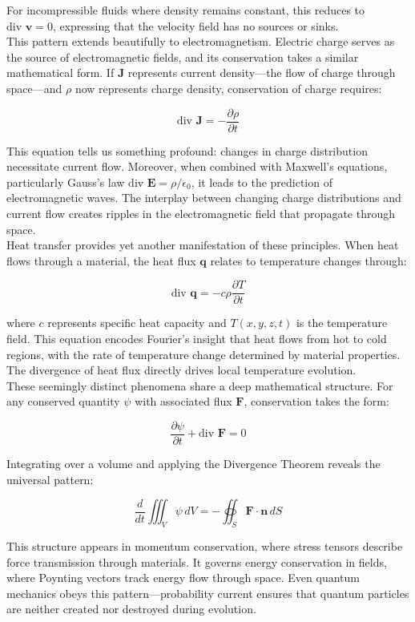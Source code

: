 \noindent For incompressible fluids where density remains constant, this reduces to $\text{div }\mathbf{v} = 0$, expressing that the velocity field has no sources or sinks. \\

\noindent This pattern extends beautifully to electromagnetism. Electric charge serves as the source of electromagnetic fields, and its conservation takes a similar mathematical form. If $\mathbf{J}$ represents current density—the flow of charge through space—and $\rho$ now represents charge density, conservation of charge requires:

\[
\text{div }\mathbf{J} = -\frac{\partial \rho}{\partial t}
\]

\noindent This equation tells us something profound: changes in charge distribution necessitate current flow. Moreover, when combined with Maxwell's equations, particularly Gauss's law $\text{div }\mathbf{E} = \rho/\epsilon_0$, it leads to the prediction of electromagnetic waves. The interplay between changing charge distributions and current flow creates ripples in the electromagnetic field that propagate through space. \\

\noindent Heat transfer provides yet another manifestation of these principles. When heat flows through a material, the heat flux $\mathbf{q}$ relates to temperature changes through:

\[
\text{div }\mathbf{q} = -c\rho\frac{\partial T}{\partial t}
\]

\noindent where $c$ represents specific heat capacity and $T(x,y,z,t)$ is the temperature field. This equation encodes Fourier's insight that heat flows from hot to cold regions, with the rate of temperature change determined by material properties. The divergence of heat flux directly drives local temperature evolution. \\

\noindent These seemingly distinct phenomena share a deep mathematical structure. For any conserved quantity $\psi$ with associated flux $\mathbf{F}$, conservation takes the form:

\[
\frac{\partial \psi}{\partial t} + \text{div }\mathbf{F} = 0
\]

\noindent Integrating over a volume and applying the Divergence Theorem reveals the universal pattern:

\[
\frac{d}{dt}\iiint_V \psi\,dV = -\oiint_S \mathbf{F} \cdot \mathbf{n}\,dS
\]

\noindent This structure appears in momentum conservation, where stress tensors describe force transmission through materials. It governs energy conservation in fields, where Poynting vectors track energy flow through space. Even quantum mechanics obeys this pattern—probability current ensures that quantum particles are neither created nor destroyed during evolution. \\

